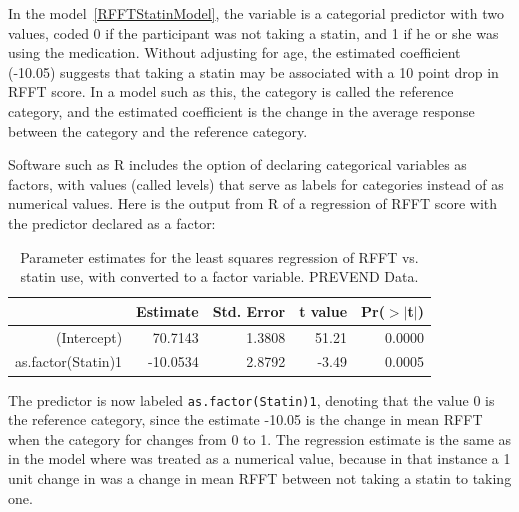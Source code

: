In the model~\ref{RFFTStatinModel}, the variable  is a categorial predictor with two values, coded 0 if the participant was not taking a statin, and 1 if he or she was using the medication.  Without adjusting for age, the estimated coefficient (-10.05) suggests that taking a statin may be associated with a 10 point drop in RFFT score.  In a model such as this, the category  is called the reference category, and the estimated coefficient is the change in the average response between the category  and the reference category.

Software such as \textsf{R} includes the option of declaring categorical variables as factors, with values (called levels) that serve as labels for categories instead of as numerical values.  Here is the output from \textsf{R} of a regression of RFFT score with the predictor  declared as a factor:


\begin{table}[ht]
\centering
\begin{tabular}{rrrrr}
  \hline
 & Estimate & Std. Error & t value & Pr($>$$|$t$|$) \\ 
  \hline
(Intercept) & 70.7143 & 1.3808 & 51.21 & 0.0000 \\ 
  as.factor(Statin)1 & -10.0534 & 2.8792 & -3.49 & 0.0005 \\ 
   \hline
\end{tabular}
\caption{Parameter estimates for the least squares regression of RFFT vs. statin use,  with  converted to a factor variable.  PREVEND Data.}
\end{table} 

The predictor is now labeled \texttt{as.factor(Statin)1}, denoting that the value 0 is the reference category, since the estimate -10.05 is the change in mean RFFT when the category for  changes from 0 to 1.  The regression estimate is the same as in the model where  was treated as a numerical value, because in that instance a 1 unit change in  was a change in mean RFFT between not taking a statin to taking one.  

